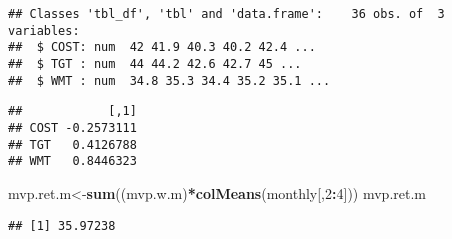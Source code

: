 \documentclass[]{article}
\newenvironment{Shaded}{\begin{snugshade}}{\end{snugshade}}
\newcommand{\DataTypeTok}[1]{\textcolor[rgb]{0.13,0.29,0.53}{#1}}
\newcommand{\DecValTok}[1]{\textcolor[rgb]{0.00,0.00,0.81}{#1}}
\newcommand{\KeywordTok}[1]{\textcolor[rgb]{0.13,0.29,0.53}{\textbf{#1}}}
\newcommand{\NormalTok}[1]{#1}
\newcommand{\OperatorTok}[1]{\textcolor[rgb]{0.81,0.36,0.00}{\textbf{#1}}}
\newcommand{\StringTok}[1]{\textcolor[rgb]{0.31,0.60,0.02}{#1}}
\begin{document}
\begin{verbatim}
## Classes 'tbl_df', 'tbl' and 'data.frame':    36 obs. of  3 variables:
##  $ COST: num  42 41.9 40.3 40.2 42.4 ...
##  $ TGT : num  44 44.2 42.6 42.7 45 ...
##  $ WMT : num  34.8 35.3 34.4 35.2 35.1 ...
\end{verbatim}

\begin{Shaded}
\end{Shaded}

\begin{verbatim}
##            [,1]
## COST -0.2573111
## TGT   0.4126788
## WMT   0.8446323
\end{verbatim}

\begin{Shaded}
\begin{Highlighting}[]
\NormalTok{mvp.ret.m<-}\KeywordTok{sum}\NormalTok{((mvp.w.m)}\OperatorTok{*}\KeywordTok{colMeans}\NormalTok{(monthly[,}\DecValTok{2}\OperatorTok{:}\DecValTok{4}\NormalTok{]))}
\NormalTok{mvp.ret.m}
\end{Highlighting}
\end{Shaded}

\begin{verbatim}
## [1] 35.97238
\end{verbatim}
\end{document}
